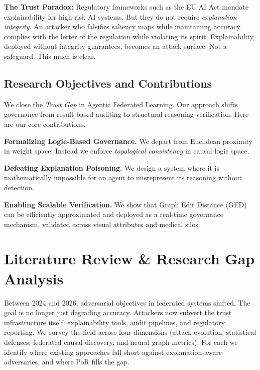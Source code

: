 \documentclass[journal]{IEEEtran}
\begin{document}
\textbf{The Trust Paradox:}
Regulatory frameworks such as the EU AI Act mandate explainability for high-risk AI systems. But they do not require \emph{explanation integrity}. An attacker who falsifies saliency maps while maintaining accuracy complies with the letter of the regulation while violating its spirit. Explainability, deployed without integrity guarantees, becomes an attack surface. Not a safeguard. This much is clear.

\subsection{Research Objectives and Contributions}

We close the \emph{Trust Gap} in Agentic Federated Learning. Our approach shifts governance from result-based auditing to structural reasoning verification. Here are our core contributions.

\noindent\textbf{Formalizing Logic-Based Governance.}
We depart from Euclidean proximity in weight space. Instead we enforce \emph{topological consistency} in causal logic space.

\noindent\textbf{Defeating Explanation Poisoning.}
We design a system where it is mathematically impossible for an agent to misrepresent its reasoning without detection.

\noindent\textbf{Enabling Scalable Verification.}
We show that Graph Edit Distance (GED) can be efficiently approximated and deployed as a real-time governance mechanism, validated across visual attributes and medical silos.

\newpage
\section{Literature Review \& Research Gap Analysis}

Between 2024 and 2026, adversarial objectives in federated systems shifted. The goal is no longer just degrading accuracy. Attackers now subvert the trust infrastructure itself: explainability tools, audit pipelines, and regulatory reporting. We survey the field across four dimensions (attack evolution, statistical defenses, federated causal discovery, and neural graph metrics). For each we identify where existing approaches fall short against explanation-aware adversaries, and where PoR fills the gap.
\end{document}
